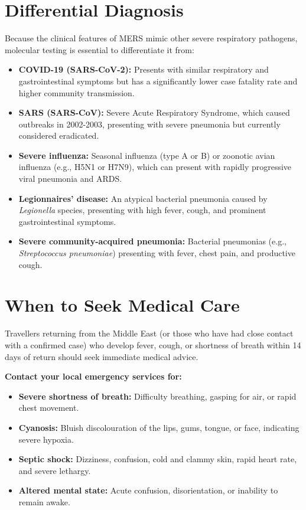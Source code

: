 \section*{Differential Diagnosis}
Because the clinical features of MERS mimic other severe respiratory pathogens, molecular testing is essential to differentiate it from:
\begin{itemize}
    \item \textbf{COVID-19 (SARS-CoV-2):} Presents with similar respiratory and gastrointestinal symptoms but has a significantly lower case fatality rate and higher community transmission.
    \item \textbf{SARS (SARS-CoV):} Severe Acute Respiratory Syndrome, which caused outbreaks in 2002-2003, presenting with severe pneumonia but currently considered eradicated.
    \item \textbf{Severe influenza:} Seasonal influenza (type A or B) or zoonotic avian influenza (e.g., H5N1 or H7N9), which can present with rapidly progressive viral pneumonia and ARDS.
    \item \textbf{Legionnaires' disease:} An atypical bacterial pneumonia caused by \textit{Legionella} species, presenting with high fever, cough, and prominent gastrointestinal symptoms.
    \item \textbf{Severe community-acquired pneumonia:} Bacterial pneumonias (e.g., \textit{Streptococcus pneumoniae}) presenting with fever, chest pain, and productive cough.
\end{itemize}

\section*{When to Seek Medical Care}
Travellers returning from the Middle East (or those who have had close contact with a confirmed case) who develop fever, cough, or shortness of breath within 14 days of return should seek immediate medical advice.

\textbf{Contact your local emergency services for:}
\begin{itemize}
    \item \textbf{Severe shortness of breath:} Difficulty breathing, gasping for air, or rapid chest movement.
    \item \textbf{Cyanosis:} Bluish discolouration of the lips, gums, tongue, or face, indicating severe hypoxia.
    \item \textbf{Septic shock:} Dizziness, confusion, cold and clammy skin, rapid heart rate, and severe lethargy.
    \item \textbf{Altered mental state:} Acute confusion, disorientation, or inability to remain awake.
\end{itemize}

